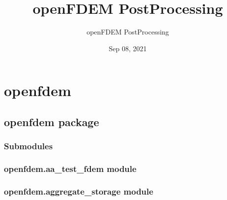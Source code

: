 \documentclass[letterpaper,10pt,english]{sphinxmanual}
\title{openFDEM Post\sphinxhyphen{}Processing}
\date{Sep 08, 2021}
\author{openFDEM Post\sphinxhyphen{}Processing}
\begin{document}
\pagestyle{empty}
\sphinxmaketitle
\pagestyle{plain}
\sphinxtableofcontents
\pagestyle{normal}
\label{\detokenize{index::doc}}



\chapter{openfdem}
\label{\detokenize{modules:openfdem}}\label{\detokenize{modules::doc}}

\section{openfdem package}
\label{\detokenize{openfdem:openfdem-package}}\label{\detokenize{openfdem::doc}}

\subsection{Submodules}
\label{\detokenize{openfdem:submodules}}

\subsection{openfdem.aa\_test\_fdem module}
\label{\detokenize{openfdem:openfdem-aa-test-fdem-module}}

\subsection{openfdem.aggregate\_storage module}
\label{\detokenize{openfdem:module-openfdem.aggregate_storage}}\label{\detokenize{openfdem:openfdem-aggregate-storage-module}}
\end{document}
